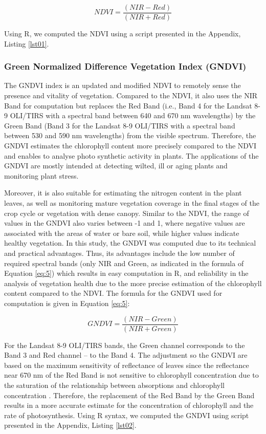 \documentclass[jimaging,article,submit,pdftex,moreauthors]{Definitions/mdpi}
\begin{document}
\begin{equation}\label{eq:1}
NDVI=\dfrac{(NIR-Red)}{(NIR+Red)}
\end{equation}

Using R, we computed the NDVI using a script presented in the Appendix, Listing \ref{lst01}. 

\subsubsection{Green Normalized Difference Vegetation Index (GNDVI)}

The GNDVI index is an updated and modified NDVI to remotely sense the presence and vitality of vegetation. Compared to the NDVI, it also uses the NIR Band for computation but replaces the Red Band (i.e., Band 4 for the Landsat 8-9 OLI/TIRS with a spectral band between 640 and 670 nm wavelengths) by the Green Band (Band 3 for the Landsat 8-9 OLI/TIRS with a spectral band between 530 and 590 nm wavelengths) from the visible spectrum. Therefore, the GNDVI estimates the chlorophyll content more precisely compared to the NDVI and enables to analyse photo synthetic activity in plants. The applications of the GNDVI are mostly intended at detecting wilted, ill or aging plants and monitoring plant stress. 

Moreover, it is also suitable for estimating the nitrogen content in the plant leaves, as well as monitoring mature vegetation coverage in the final stages of the crop cycle or vegetation with dense canopy. Similar to the NDVI, the range of values in the GNDVI also varies between -1 and 1, where negative values are associated with the areas of water or bare soil, while higher values indicate healthy vegetation. In this study, the GNDVI was computed due to its technical and practical advantages. Thus, its advantages include the low number of required spectral bands (only NIR and Green, as indicated in the formula of Equation \ref{eq:5}) which results in easy computation in R, and reliability in the analysis of vegetation health due to the more precise estimation of the chlorophyll content compared to the NDVI. The formula for the GNDVI used for computation is given in Equation \ref{eq:5}:

\begin{equation}\label{eq:5}
	GNDVI=\dfrac{(NIR-Green)}{(NIR+Green)}
\end{equation}

For the Landsat 8-9 OLI/TIRS bands, the Green channel corresponds to the Band 3 and Red channel -- to the Band 4. The adjustment so the GNDVI are based on the maximum sensitivity of reflectance of leaves since the reflectance near 670 nm of the Red Band is not sensitive to chlorophyll concentration due to the saturation of the relationship between absorptions and chlorophyll concentration \cite{GITELSON1996289}. Therefore, the replacement of the Red Band by the Green Band results in a more accurate estimate for the concentration of chlorophyll and the rate of photosynthesis. Using R syntax, we computed the GNDVI using script presented in the Appendix, Listing \ref{lst02}. 
\end{document}
